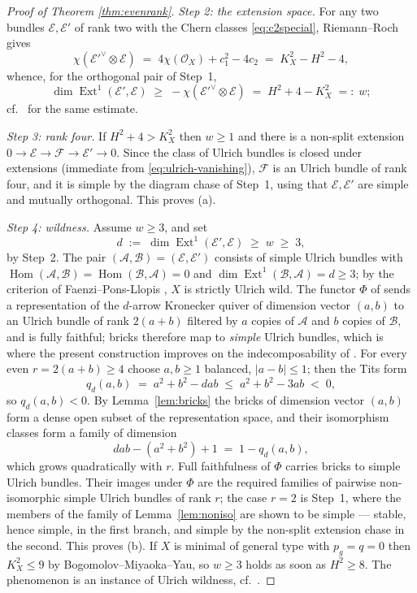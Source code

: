 \documentclass{amsart}
\theoremstyle{definition}
\newcommand{\OO}{\mathcal{O}}
\newcommand{\EE}{\mathcal{E}}
\newcommand{\FF}{\mathcal{F}}
\newcommand{\Ext}{\operatorname{Ext}}
\newcommand{\Hom}{\operatorname{Hom}}
\begin{document}
\begin{proof}[Proof of Theorem \textup{\ref{thm:evenrank}}]
\smallskip
\noindent \emph{Step 2: the extension space.} For any two bundles $\EE,\EE'$ of rank two with the Chern classes \eqref{eq:c2special}, Riemann--Roch gives
\[
\chi(\EE'^\vee\otimes\EE)\;=\;4\chi(\OO_X)+c_1^2-4c_2\;=\;K_X^2-H^2-4 ,
\]
whence, for the orthogonal pair of Step~1,
\[
\dim\Ext^1(\EE',\EE)\;\ge\;-\chi(\EE'^\vee\otimes\EE)\;=\;H^2+4-K_X^2\;=:\;w ;
\]
cf.\ \cite[Lem.~5.2]{Cas17} for the same estimate.

\smallskip
\noindent \emph{Step 3: rank four.} If $H^2+4>K_X^2$ then $w\ge1$ and there is a non-split extension $0\to\EE\to\FF\to\EE'\to0$. Since the class of Ulrich bundles is closed under extensions (immediate from \eqref{eq:ulrich-vanishing}), $\FF$ is an Ulrich bundle of rank four, and it is simple by the diagram chase of Step~1, using that $\EE,\EE'$ are simple and mutually orthogonal. This proves (a).

\smallskip
\noindent \emph{Step 4: wildness.} Assume $w\ge3$, and set
\[
d\;:=\;\dim\Ext^1(\EE',\EE)\;\ge\;w\;\ge\;3 ,
\]
by Step~2. The pair $(\mathcal{A},\mathcal{B})=(\EE,\EE')$ consists of simple Ulrich bundles with $\Hom(\mathcal{A},\mathcal{B})=\Hom(\mathcal{B},\mathcal{A})=0$ and $\dim\Ext^1(\mathcal{B},\mathcal{A})=d\ge3$; by the criterion of Faenzi--Pons-Llopis \cite[Thm.~A and Cor.~2.1]{FPL}, $X$ is strictly Ulrich wild. The functor $\Phi$ of \cite[\S2]{FPL} sends a representation of the $d$-arrow Kronecker quiver of dimension vector $(a,b)$ to an Ulrich bundle of rank $2(a+b)$ filtered by $a$ copies of $\mathcal{A}$ and $b$ copies of $\mathcal{B}$, and is fully faithful; bricks therefore map to \emph{simple} Ulrich bundles, which is where the present construction improves on the indecomposability of \cite[Thm.~1.3]{Cas17}. For every even $r=2(a+b)\ge4$ choose $a,b\ge1$ balanced, $|a-b|\le1$; then the Tits form
\[
q_d(a,b)\;=\;a^2+b^2-dab\;\le\;a^2+b^2-3ab\;<\;0 ,
\]
so $q_d(a,b)<0$. By Lemma~\ref{lem:bricks} the bricks of dimension vector $(a,b)$ form a dense open subset of the representation space, and their isomorphism classes form a family of dimension
\[
dab-(a^2+b^2)+1\;=\;1-q_d(a,b) ,
\]
which grows quadratically with $r$. Full faithfulness of $\Phi$ \cite[Thm.~A]{FPL} carries bricks to simple Ulrich bundles. Their images under $\Phi$ are the required families of pairwise non-isomorphic simple Ulrich bundles of rank $r$; the case $r=2$ is Step~1, where the members of the family of Lemma~\ref{lem:noniso} are shown to be simple --- stable, hence simple, in the first branch, and simple by the non-split extension chase in the second. This proves (b). If $X$ is minimal of general type with $p_g=q=0$ then $K_X^2\le9$ by Bogomolov--Miyaoka--Yau, so $w\ge3$ holds as soon as $H^2\ge8$. The phenomenon is an instance of Ulrich wildness, cf.\ \cite{FPL,CasWild}.
\end{proof}
\end{document}
